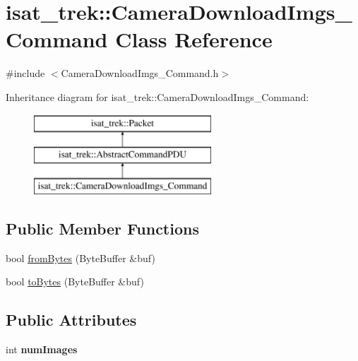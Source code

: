\hypertarget{classisat__trek_1_1_camera_download_imgs___command}{}\section{isat\+\_\+trek\+:\+:Camera\+Download\+Imgs\+\_\+\+Command Class Reference}
\label{classisat__trek_1_1_camera_download_imgs___command}


{\ttfamily \#include $<$Camera\+Download\+Imgs\+\_\+\+Command.\+h$>$}

Inheritance diagram for isat\+\_\+trek\+:\+:Camera\+Download\+Imgs\+\_\+\+Command\+:\begin{figure}[H]
\begin{center}
\leavevmode
\includegraphics[height=3.000000cm]{classisat__trek_1_1_camera_download_imgs___command}
\end{center}
\end{figure}
\subsection*{Public Member Functions}
\begin{DoxyCompactItemize}
\item 
bool \hyperlink{classisat__trek_1_1_camera_download_imgs___command_a4578459c7137386128b7043cd1e7ecb9}{from\+Bytes} (Byte\+Buffer \&buf)
\item 
bool \hyperlink{classisat__trek_1_1_camera_download_imgs___command_a4273aeaf8bfef5ad5cb900c93b7b7e4a}{to\+Bytes} (Byte\+Buffer \&buf)
\end{DoxyCompactItemize}
\subsection*{Public Attributes}
\begin{DoxyCompactItemize}
\item 
int {\bfseries num\+Images}\hypertarget{classisat__trek_1_1_camera_download_imgs___command_a89b9fcceb637f01c2346d7f47e9a3dce}{}\label{classisat__trek_1_1_camera_download_imgs___command_a89b9fcceb637f01c2346d7f47e9a3dce}

\end{DoxyCompactItemize}



